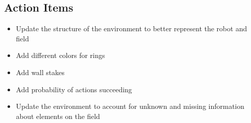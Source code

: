 \subsection{Action Items}
\begin{itemize}
    \item Update the structure of the environment to better represent the robot and field
    \item Add different colors for rings
    \item Add wall stakes
    \item Add probability of actions succeeding
    \item Update the environment to account for unknown and missing information about elements on the field
\end{itemize}